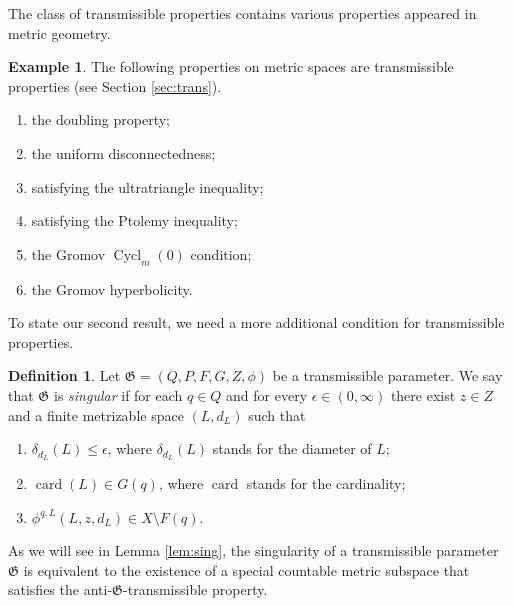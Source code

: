 \documentclass[a4paper, 12pt]{amsart}
\theoremstyle{plain}
\theoremstyle{definition}
\newtheorem{df}{Definition}[section]
\newtheorem{exam}{Example}[section]
\theoremstyle{remark}
\DeclareMathOperator{\card}{card}
\DeclareMathOperator{\cycl}{Cycl}
\begin{document}
The class of transmissible properties contains various properties appeared in metric geometry. 
\begin{exam}\label{exam:prop}
The following properties on metric spaces are transmissible properties  
(see Section \ref{sec:trans}). 
\begin{enumerate}[label=\textup{(\arabic*)}]
\item\label{item:doubling1010}
 the doubling property; 

\item  
the uniform disconnectedness; 

\item 
satisfying the ultratriangle inequality; 

\item  
satisfying the Ptolemy inequality; 

\item\label{item:gcyc1010}
 the Gromov 
$\cycl_{m}(0)$  condition;

\item the Gromov hyperbolicity. 
\end{enumerate}
\end{exam}




To state  our second result, we need a more additional condition for  transmissible properties. 
\begin{df}
Let 
$\mathfrak{G}=(Q, P, F, G, Z, \phi)$ 
be a transmissible parameter. 
We say that 
$\mathfrak{G}$ 
is 
\emph{singular} 
if for each 
$q\in Q$ 
and for every 
$\epsilon\in (0, \infty)$
there exist 
$z\in Z$ 
and  a finite metrizable  space 
$(L, d_{L})$ 
such that 
\begin{enumerate}

%
	\item 
	$\delta_{d_{L}}(L)\le \epsilon$, 
	where 
	$\delta_{d_{L}}(L)$ 
	stands for the diameter of $L$; 
	
	\item 
	$\card(L)\in G(q)$, 
	where 
	$\card$ 
	stands for the cardinality; 
	
	\item 
	$\phi^{q, L}(L, z, d_{L})\in X\setminus F(q)$. 
\end{enumerate}
\end{df}
As we will  see in 
Lemma \ref{lem:sing}, 
the singularity of  a transmissible parameter
$\mathfrak{G}$  is 
equivalent  to the existence of 
a special countable metric subspace  that 
satisfies  the anti-$\mathfrak{G}$-transmissible property. 
\end{document}

